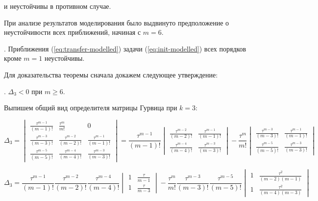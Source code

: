 и неустойчивы в противном случае.

При анализе результатов моделирования было выдвинуто предположение о неустойчивости всех приближений, начиная с $m=6$.

. Приближения (\ref{eq:transfer-modelled}) задачи (\ref{eq:init-modelled}) всех порядков кроме $m=1$ неустойчивы.

Для доказательства теоремы сначала докажем следующее утверждение:

. $\Delta_3 < 0$ при $m \geq 6$.

Выпишем общий вид определителя матрицы Гурвица при $k=3$:

\begin{equation*}
\Delta_3 = 
\begin{vmatrix}
\frac{\tau^{m-1}}{(m-1)!} & \frac{\tau^{m}}{m!} & 0\\
\frac{\tau^{m-3}}{(m-3)!} & \frac{\tau^{m-2}}{(m-2)!} & \frac{\tau^{m-1}}{(m-1)!}\\
\frac{\tau^{m-5}}{(m-5)!} & \frac{\tau^{m-4}}{(m-4)!} & \frac{\tau^{m-3}}{(m-3)!}
\end{vmatrix} =
\dfrac{\tau^{m-1}}{(m-1)!}
\begin{vmatrix}
\frac{\tau^{m-2}}{(m-2)!} & \frac{\tau^{m-1}}{(m-1)!}\\
\frac{\tau^{m-4}}{(m-4)!} & \frac{\tau^{m-3}}{(m-3)!}
\end{vmatrix}
- \dfrac{\tau^{m}}{m!}
\begin{vmatrix}
\frac{\tau^{m-3}}{(m-3)!} & \frac{\tau^{m-1}}{(m-1)!}\\
\frac{\tau^{m-5}}{(m-5)!} & \frac{\tau^{m-3}}{(m-3)!}
\end{vmatrix}
\end{equation*}

\begin{equation*}
\Delta_3 =
\dfrac{\tau^{m-1}}{(m-1)!} \dfrac{\tau^{m-2}}{(m-2)!} \dfrac{\tau^{m-4}}{(m-4)!}
\begin{vmatrix}
1 & \frac{\tau}{m-1}\\
1 & \frac{\tau}{m-3}
\end{vmatrix}
- \dfrac{\tau^{m}}{m!} \dfrac{\tau^{m-3}}{(m-3)!} \dfrac{\tau^{m-5}}{(m-5)!}
\begin{vmatrix}
1 & \frac{\tau^2}{(m-2)(m-1)}\\
1 & \frac{\tau^2}{(m-4)(m-3)}
\end{vmatrix}
\end{equation*}

